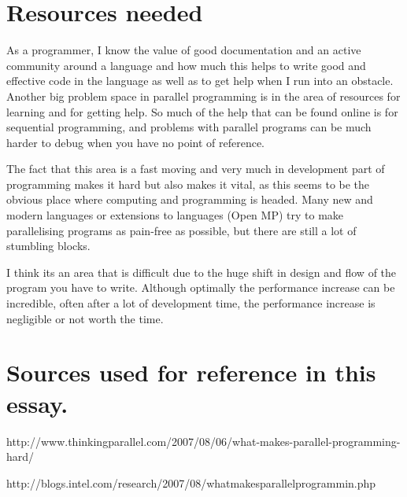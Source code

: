 \documentclass{article}
\begin{document}
\section*{ Resources needed}


As a programmer, I know the value of good documentation and an active community around a language and how much this helps to write good and effective code in the language as well as to get help when I run into an obstacle. Another big problem space in parallel programming is in the area of resources for learning and for getting help. So much of the help that can be found online is for sequential programming, and problems with parallel programs can be much harder to debug when you have no point of reference.



The fact that this area is a fast moving and very much in development part of programming makes it hard but also makes it vital, as this seems to be the obvious place where computing and programming is headed. Many new and modern languages or extensions to languages (Open MP) try to make parallelising programs as pain-free as possible, but there are still a lot of stumbling blocks.



I think its an area that is difficult due to the huge shift in design and flow of the program you have to write. Although optimally the performance increase can be incredible, often after a lot of development time, the performance increase is negligible or not worth the time.



\section*{ Sources used for reference in this essay.}


http://www.thinkingparallel.com/2007/08/06/what-makes-parallel-programming-hard/

http://blogs.intel.com/research/2007/08/what\textunderscore makes\textunderscore parallel\textunderscore programmin.php
\end{document}
